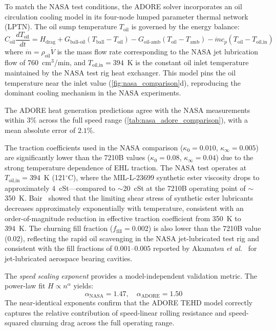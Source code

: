 \documentclass[preprint,12pt]{elsarticle}
\begin{document}
To match the NASA test conditions, the ADORE solver incorporates an oil circulation cooling model in its four-node lumped parameter thermal network (LPTN). The oil sump temperature $T_{\text{oil}}$ is governed by the energy balance:
\begin{equation}
    C_{\text{oil}} \frac{dT_{\text{oil}}}{dt} = H_{\text{drag}} + G_{\text{ball-oil}}(T_{\text{ball}} - T_{\text{oil}}) - G_{\text{oil-amb}}(T_{\text{oil}} - T_{\text{amb}}) - \dot{m} c_p (T_{\text{oil}} - T_{\text{oil,in}})
    \label{eq:oil_flow}
\end{equation}
where $\dot{m} = \rho_{\text{oil}} \dot{V}$ is the mass flow rate corresponding to the NASA jet lubrication flow of 760~cm$^3$/min, and $T_{\text{oil,in}} = 394$~K is the constant oil inlet temperature maintained by the NASA test rig heat exchanger. This model pins the oil temperature near the inlet value (\cref{fig:nasa_comparison}d), reproducing the dominant cooling mechanism in the NASA experiments.

The ADORE heat generation predictions agree with the NASA measurements within $3\%$ across the full speed range (\cref{tab:nasa_adore_comparison}), with a mean absolute error of $2.1\%$.

The traction coefficients used in the NASA comparison ($\kappa_0 = 0.010$, $\kappa_\infty = 0.005$) are significantly lower than the 7210B values ($\kappa_0 = 0.08$, $\kappa_\infty = 0.04$) due to the strong temperature dependence of EHL traction. The NASA test operates at $T_{\text{oil,in}} = 394$~K (121$^\circ$C), where the MIL-L-23699 synthetic ester viscosity drops to approximately $4$~cSt---compared to $\sim$20~cSt at the 7210B operating point of $\sim$350~K. Bair~\cite{Bair2006} showed that the limiting shear stress of synthetic ester lubricants decreases approximately exponentially with temperature, consistent with an order-of-magnitude reduction in effective traction coefficient from 350~K to 394~K. The churning fill fraction ($f_{\text{fill}} = 0.002$) is also lower than the 7210B value ($0.02$), reflecting the rapid oil scavenging in the NASA jet-lubricated test rig and consistent with the fill fractions of $0.001$--$0.005$ reported by Akamatsu \textit{et al.}~\cite{Akamatsu2009} for jet-lubricated aerospace bearing cavities.

The \emph{speed scaling exponent} provides a model-independent validation metric. The power-law fit $H \propto n^\alpha$ yields:
\begin{equation}
    \alpha_{\text{NASA}} = 1.47, \quad \alpha_{\text{ADORE}} = 1.50
    \label{eq:scaling}
\end{equation}
The near-identical exponents confirm that the ADORE TEHD model correctly captures the relative contribution of speed-linear rolling resistance and speed-squared churning drag across the full operating range.
\end{document}
